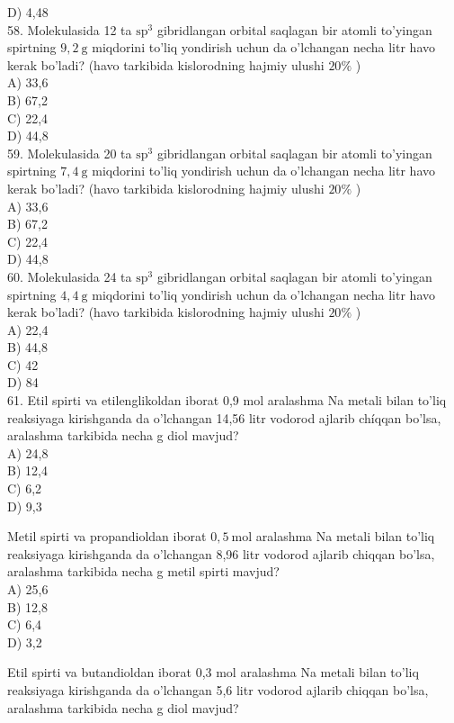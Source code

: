 D) 4,48\\
58. Molekulasida 12 ta $\mathrm{sp}^{3}$ gibridlangan orbital saqlagan bir atomli to'yingan spirtning $9,2 \mathrm{~g}$ miqdorini to'liq yondirish uchun da o'lchangan necha litr havo kerak bo'ladi? (havo tarkibida kislorodning hajmiy ulushi $20 \%$ )\\
A) 33,6\\
B) 67,2\\
C) 22,4\\
D) 44,8\\
59. Molekulasida 20 ta $\mathrm{sp}^{3}$ gibridlangan orbital saqlagan bir atomli to'yingan spirtning $7,4 \mathrm{~g}$ miqdorini to'liq yondirish uchun da o'lchangan necha litr havo kerak bo'ladi? (havo tarkibida kislorodning hajmiy ulushi $20 \%$ )\\
A) 33,6\\
B) 67,2\\
C) 22,4\\
D) 44,8\\
60. Molekulasida 24 ta $\mathrm{sp}^{3}$ gibridlangan orbital saqlagan bir atomli to'yingan spirtning $4,4 \mathrm{~g}$ miqdorini to'liq yondirish uchun da o'lchangan necha litr havo kerak bo'ladi? (havo tarkibida kislorodning hajmiy ulushi $20 \%$ )\\
A) 22,4\\
B) 44,8\\
C) 42\\
D) 84\\
61. Etil spirti va etilenglikoldan iborat 0,9 mol aralashma Na metali bilan to'liq reaksiyaga kirishganda da o'lchangan 14,56 litr vodorod ajlarib chíqqan bo'lsa, aralashma tarkibida necha g diol mavjud?\\
A) 24,8\\
B) 12,4\\
C) 6,2\\
D) 9,3
  \item Metil spirti va propandioldan iborat $0,5 \mathrm{~mol}$ aralashma Na metali bilan to'liq reaksiyaga kirishganda da o'lchangan 8,96 litr vodorod ajlarib chiqqan bo'lsa, aralashma tarkibida necha g metil spirti mavjud?\\
A) 25,6\\
B) 12,8\\
C) 6,4\\
D) 3,2
  \item Etil spirti va butandioldan iborat 0,3 mol aralashma Na metali bilan to'liq reaksiyaga kirishganda da o'lchangan 5,6 litr vodorod ajlarib chiqqan bo'lsa, aralashma tarkibida necha g diol mavjud?\\
